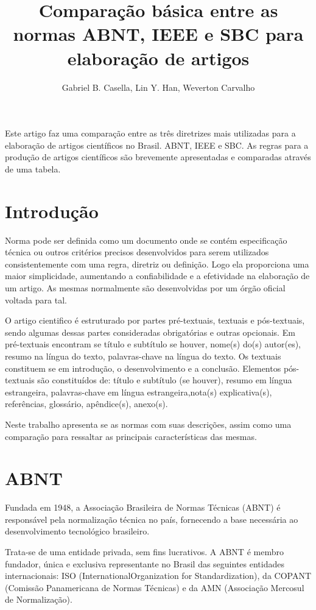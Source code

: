 \documentclass[12pt]{article}
\title{Comparação básica entre as normas ABNT, IEEE e SBC para elaboração de artigos}
\author{Gabriel B. Casella, Lin Y. Han, Weverton Carvalho}
\begin{document}
 

\maketitle

\begin{resumo}
Este artigo faz uma comparação entre as três diretrizes mais utilizadas para a elaboração de artigos científicos no Brasil. ABNT, IEEE e SBC. As regras para a produção de artigos científicos são brevemente apresentadas e comparadas através de uma tabela.
\end{resumo}

\section{Introdução}	
Norma pode ser definida como um documento onde se contém especificação técnica ou outros critérios precisos desenvolvidos para serem utilizados consistentemente com uma regra, diretriz ou definição. Logo ela proporciona uma maior simplicidade, aumentando a confiabilidade e a efetividade na elaboração de um artigo. As mesmas normalmente são desenvolvidas por um órgão oficial voltada para tal.

O artigo cientifico é estruturado  por partes pré-textuais, textuais e pós-textuais, sendo algumas dessas partes consideradas obrigatórias e outras opcionais. Em pré-textuais encontram se título e subtítulo se houver, nome(s) do(s) autor(es), resumo na língua do texto, palavras-chave na língua do texto. Os textuais constituem se em  introdução, o desenvolvimento e a conclusão. Elementos pós-textuais são constituídos de: título e subtítulo (se houver), resumo em língua estrangeira, palavras-chave em língua estrangeira,nota(s) explicativa(s), referências, glossário, apêndice(s), anexo(s).

Neste trabalho apresenta se as normas com suas descrições, assim como  uma comparação para ressaltar as principais características das mesmas.

\section{ABNT}
Fundada em 1948, a Associação Brasileira de Normas Técnicas (ABNT) é responsável pela normalização técnica no país, fornecendo a base necessária ao desenvolvimento tecnológico brasileiro\cite{ABNT:NBR6022}.

Trata-se de uma entidade privada, sem fins lucrativos. A ABNT é membro fundador, única e exclusiva representante no Brasil das seguintes entidades internacionais: ISO (InternationalOrganization for Standardization), da COPANT (Comissão Panamericana de Normas Técnicas) e da AMN (Associação Mercosul de Normalização)\cite{ABNT:NBR6022}.
\end{document}
